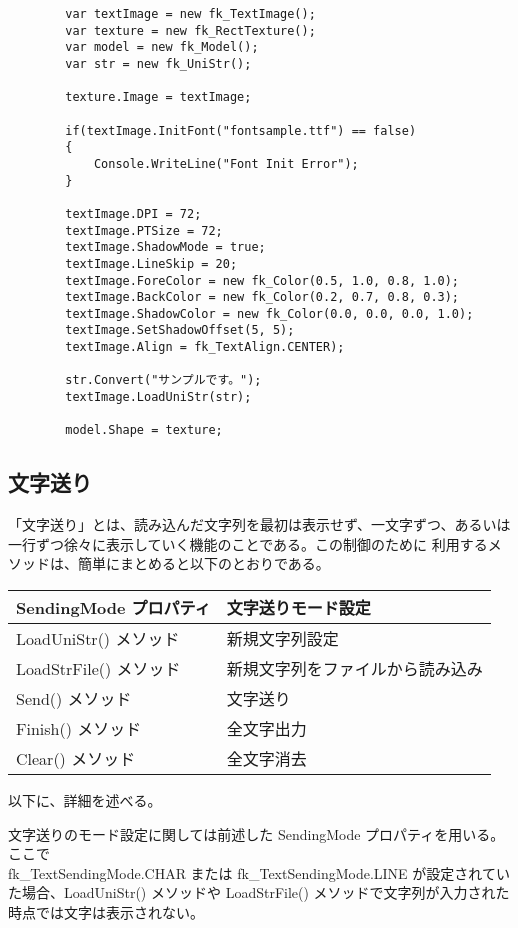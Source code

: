 \begin{breakbox}
\begin{verbatim}
        var textImage = new fk_TextImage();
        var texture = new fk_RectTexture();
        var model = new fk_Model();
        var str = new fk_UniStr();

        texture.Image = textImage;

        if(textImage.InitFont("fontsample.ttf") == false)
        {
            Console.WriteLine("Font Init Error");
        }

        textImage.DPI = 72;
        textImage.PTSize = 72;
        textImage.ShadowMode = true;
        textImage.LineSkip = 20;
        textImage.ForeColor = new fk_Color(0.5, 1.0, 0.8, 1.0);
        textImage.BackColor = new fk_Color(0.2, 0.7, 0.8, 0.3);
        textImage.ShadowColor = new fk_Color(0.0, 0.0, 0.0, 1.0);
        textImage.SetShadowOffset(5, 5);
        textImage.Align = fk_TextAlign.CENTER);

        str.Convert("サンプルです。");
        textImage.LoadUniStr(str);

        model.Shape = texture;
\end{verbatim}
\end{breakbox}

\subsection{文字送り} \label{subsec:textSending}
「文字送り」とは、読み込んだ文字列を最初は表示せず、一文字ずつ、あるいは
一行ずつ徐々に表示していく機能のことである。この制御のために
利用するメソッドは、簡単にまとめると以下のとおりである。
\begin{center}
\begin{tabular}{|l|l|}
\hline
SendingMode プロパティ & 文字送りモード設定 \\ \hline
LoadUniStr() メソッド & 新規文字列設定 \\ \hline
LoadStrFile() メソッド & 新規文字列をファイルから読み込み \\ \hline
Send() メソッド & 文字送り \\ \hline
Finish() メソッド & 全文字出力 \\ \hline
Clear() メソッド & 全文字消去 \\ \hline
\end{tabular}
\end{center}
以下に、詳細を述べる。

文字送りのモード設定に関しては前述した SendingMode プロパティを用いる。ここで \\
fk\_TextSendingMode.CHAR または
fk\_TextSendingMode.LINE が設定されていた場合、LoadUniStr() メソッドや
LoadStrFile() メソッドで文字列が入力された時点では文字は表示されない。

